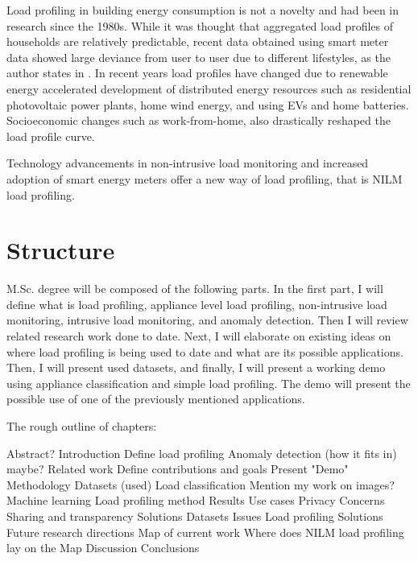 \documentclass[
11pt, %
english, %
singlespacing, %
headsepline, %
]{MastersDoctoralThesis} %
\begin{document}

Load profiling in building energy consumption is not a novelty and had been in research since the 1980s.
While it was thought that aggregated load profiles of households are relatively predictable, recent data obtained using smart meter data showed large deviance from user to user due to different lifestyles, as the author states in \cite{Review2021}.
In recent years load profiles have changed due to renewable energy accelerated development of distributed energy resources such as residential photovoltaic
power plants, home wind energy, and using EVs and home batteries. Socioeconomic changes such as work-from-home, also drastically reshaped the load profile curve. 


Technology advancements in non-intrusive load monitoring and increased adoption of smart energy meters offer a new
way of load profiling, that is NILM load profiling.

\section{Structure}
M.Sc. degree will be composed of the following parts. In the first part, I will define what is load profiling, appliance level load profiling, 
non-intrusive load monitoring, intrusive load monitoring, and anomaly detection. Then I will review related research work done to date. Next, I will elaborate 
on existing ideas on where load profiling is being used to date and what are its possible applications. Then, I will present used datasets, and finally,
I will present a working demo using appliance classification and simple load profiling.
The demo will present the possible use of one of the previously mentioned applications. 

The rough outline of chapters: 
\begin{outline}
	\1 Abstract?
	\1 Introduction
	\1 Define load profiling
	\1 Anomaly detection (how it fits in) maybe?
	\1 Related work
	\1 Define contributions and goals
	\1 Present "Demo"
	\1 Methodology
	\2 Datasets (used)
	\2 Load classification
	\3 Mention my work on images?
	\3 Machine learning
	\2 Load profiling method
	\1 Results
	\1 Use cases
	\1 Privacy
	\2 Concerns
	\2 Sharing and transparency
	\2 Solutions
	\1 Datasets
	\2 Issues 
	\2 Load profiling
	\2 Solutions
	\1 Future research directions
	\2 Map of current work
	\2 Where does NILM load profiling lay on the Map
	\1 Discussion
	\1 Conclusions
	
	\end{outline}
\end{document}

